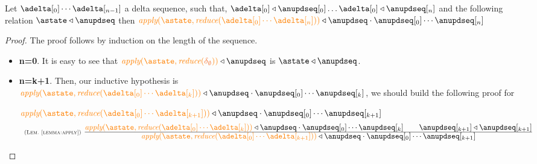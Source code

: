 %  
%
% 


\begin{lemma}\label{lemma:storechanged} Let $\adelta[_0]\cdots\adelta[_{n-1}]$ a delta sequence, such that, $\adelta[_0] \triangleleft \anupdseq[_0] \ldots \adelta[_0] \triangleleft \anupdseq[_n]$ and the following relation $\astate \triangleleft \anupdseq$ then $\iapply{\astate}{\ireduce{\adelta[_0]\cdots\adelta[_n]}}\triangleleft \anupdseq \cdot \anupdseq[_0]\cdots\anupdseq[_n]$
\end{lemma}

\begin{proof} The proof follows by induction on the length of the sequence.

\begin{itemize}
   \item{\bf n=0}. It is easy to see that $\iapply{\astate}{\ireduce{\emptydelta}}\triangleleft \anupdseq$ is $\astate \triangleleft \anupdseq$.
   \item{\bf n=k+1}. Then, our inductive hypothesis is $\iapply{\astate}{\ireduce{\adelta[_0]\cdots\adelta[_k]}}\triangleleft \anupdseq \cdot \anupdseq[_0]\cdots\anupdseq[_k]$, we should build the following proof for 
							
						$\iapply{\astate}{\ireduce{\adelta[_0]\cdots\adelta[_{k+1}]}}\triangleleft \anupdseq \cdot \anupdseq[_0]\cdots\anupdseq[_{k+1}] \ $
					\[
						  \mathrulean{\lemref{lemma:apply}}
						  {
								\iapply{\astate}{\ireduce{\adelta[_0]\cdots\adelta[_k]}}\triangleleft \anupdseq \cdot \anupdseq[_0]\cdots\anupdseq[_k]
								\quad \quad 
								\anupdseq[_{k+1}]\triangleleft\anupdseq[_{k+1}] 							
							}
  						{\iapply{\astate}{\ireduce{\adelta[_0]\cdots\adelta[_{k+1}]}}\triangleleft \anupdseq \cdot \anupdseq[_0]\cdots\anupdseq[_{k+1}]}  
					\]
	

\end{itemize}


\end{proof}


